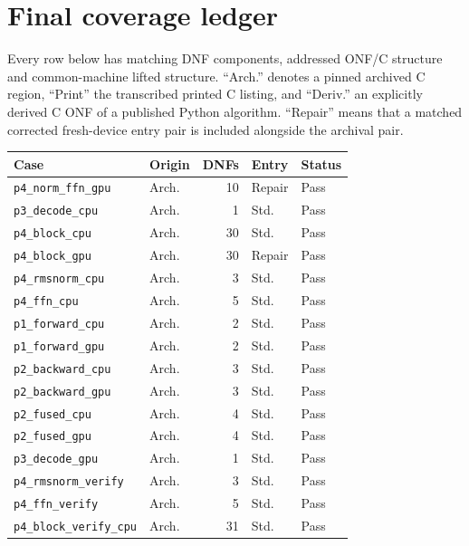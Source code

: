 \newpage\section{Final coverage ledger}
Every row below has matching DNF components, addressed ONF/C structure and
common-machine lifted structure. ``Arch.'' denotes a pinned archived C region,
``Print'' the transcribed printed C listing, and ``Deriv.'' an explicitly derived
C ONF of a published Python algorithm. ``Repair'' means that a matched corrected
fresh-device entry pair is included alongside the archival pair.
\small\begin{longtable}{p{2.9in}lrlp{.65in}}\toprule
Case & Origin & DNFs & Entry & Status\\\midrule\endhead
\texttt{p4\_\allowbreak norm\_\allowbreak ffn\_\allowbreak gpu} & Arch. & 10 & Repair & Pass\\
\texttt{p3\_\allowbreak decode\_\allowbreak cpu} & Arch. & 1 & Std. & Pass\\
\texttt{p4\_\allowbreak block\_\allowbreak cpu} & Arch. & 30 & Std. & Pass\\
\texttt{p4\_\allowbreak block\_\allowbreak gpu} & Arch. & 30 & Repair & Pass\\
\texttt{p4\_\allowbreak rmsnorm\_\allowbreak cpu} & Arch. & 3 & Std. & Pass\\
\texttt{p4\_\allowbreak ffn\_\allowbreak cpu} & Arch. & 5 & Std. & Pass\\
\texttt{p1\_\allowbreak forward\_\allowbreak cpu} & Arch. & 2 & Std. & Pass\\
\texttt{p1\_\allowbreak forward\_\allowbreak gpu} & Arch. & 2 & Std. & Pass\\
\texttt{p2\_\allowbreak backward\_\allowbreak cpu} & Arch. & 3 & Std. & Pass\\
\texttt{p2\_\allowbreak backward\_\allowbreak gpu} & Arch. & 3 & Std. & Pass\\
\texttt{p2\_\allowbreak fused\_\allowbreak cpu} & Arch. & 4 & Std. & Pass\\
\texttt{p2\_\allowbreak fused\_\allowbreak gpu} & Arch. & 4 & Std. & Pass\\
\texttt{p3\_\allowbreak decode\_\allowbreak gpu} & Arch. & 1 & Std. & Pass\\
\texttt{p4\_\allowbreak rmsnorm\_\allowbreak verify} & Arch. & 3 & Std. & Pass\\
\texttt{p4\_\allowbreak ffn\_\allowbreak verify} & Arch. & 5 & Std. & Pass\\
\texttt{p4\_\allowbreak block\_\allowbreak verify\_\allowbreak cpu} & Arch. & 31 & Std. & Pass\\

\end{longtable}
